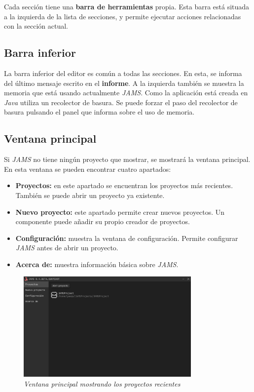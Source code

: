 Cada sección tiene una \textbf{barra de herramientas} propia.
Esta barra está situada a la izquierda de la lista de secciones, y permite
ejecutar acciones relacionadas con la sección actual.

\subsection{Barra inferior}\label{subsec:barra-inferior}

La barra inferior del editor es común a todas las secciones.
En esta, se informa del último mensaje escrito en el \textbf{informe}.
A la izquierda también se muestra la memoria que está usando actualmente
\textit{JAMS}.
Como la aplicación está creada en \textit{Java} utiliza un recolector
de basura.
Se puede forzar el paso del recolector de basura pulsando el panel que informa
sobre el uso de memoria.

\subsection{Ventana principal}\label{subsec:ventana-principal}

Si \textit{JAMS} no tiene ningún proyecto que mostrar, se mostrará la ventana
principal.
En esta ventana se pueden encontrar cuatro apartados:
\begin{itemize}
    \item \textbf{Proyectos:} en este apartado se encuentran los proyectos más
    recientes.
    También se puede abrir un proyecto ya existente.
    \item \textbf{Nuevo proyecto:} este apartado permite crear nuevos proyectos.
    Un componente puede añadir su propio creador de proyectos.
    \item \textbf{Configuración:} muestra la ventana de configuración.
    Permite configurar \textit{JAMS} antes de abrir un proyecto.
    \item \textbf{Acerca de:} muestra información básica sobre \textit{JAMS}.
\end{itemize}

\begin{figure}[H]
    \centering
    \includegraphics[width=0.8\textwidth]{images/base/jams-main-projects}
    \caption{\textit{Ventana principal mostrando los proyectos recientes}}
    \label{fig:jams-main-projects}
\end{figure}

